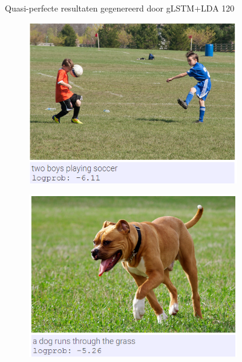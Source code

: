\begin{figure}
\begin{subfigure}{.5\textwidth}
			\label{fig:perfectresults4}
		\end{subfigure}				
		
		\caption{Quasi-perfecte resultaten gegenereerd door gLSTM+LDA 120}
		\label{fig:perfectresults}
	\end{figure}
	
		\begin{figure}
			\begin{subfigure}{.5\textwidth}
				\centering
				\includegraphics[width=.8\linewidth]{Images/Results/Perfect/playing_soccer}
				\label{fig:perfectresults5}
			\end{subfigure}%
			\begin{subfigure}{.5\textwidth}
				\centering
				\includegraphics[width=.8\linewidth]{Images/Results/Perfect/dogs_in_grass}
				\label{fig:perfectresults6}
			\end{subfigure}
			\\
			\begin{subfigure}{.5\textwidth}
				\centering

\end{subfigure}
\end{figure}

